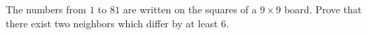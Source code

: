 The numbers from $1$ to $81$ are written on the squares of a $9 \times 9$ board. Prove that there exist two neighbors which differ by at least $6$.

